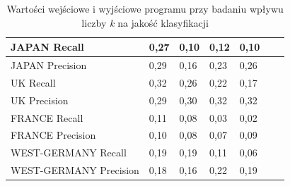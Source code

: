 \documentclass{classrep}
\begin{document}
{{\begin{table}[!htbp]
\begin{tabular}{|l|l|l|l|l|l|l|}
                    JAPAN Recall           & 0,27		        & 0,10		    & 0,12		    & 0,10		    \\ \hline
                    JAPAN Precision        & 0,29		        & 0,16		    & 0,23		    & 0,26		    \\ \hline
                    UK Recall              & 0,32		        & 0,26		    & 0,22		    & 0,17		    \\ \hline
                    UK Precision           & 0,29		        & 0,30		    & 0,32		    & 0,32		    \\ \hline
                    FRANCE Recall          & 0,11		        & 0,08		    & 0,03		    & 0,02		    \\ \hline
                    FRANCE Precision       & 0,10		        & 0,08		    & 0,07		    & 0,09		    \\ \hline
                    WEST-GERMANY Recall    & 0,19		        & 0,19		    & 0,11		    & 0,06		    \\ \hline
                    WEST-GERMANY Precision & 0,18		        & 0,16		    & 0,22		    & 0,19		    \\ \hline
                    \end{tabular}
                    \caption{Wartości wejściowe i wyjściowe programu przy badaniu wpływu liczby \emph{k} na jakość klasyfikacji} \label{table-k1}
                \end{table}
                \FloatBarrier

}}
\end{document}
